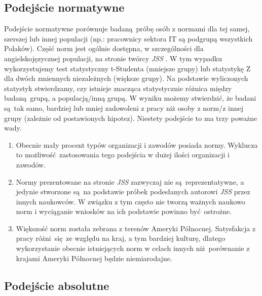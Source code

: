 \subsection{Podejście normatywne}
\label{sec:jss-calc-norm}
Podejście normatywne porównuje badaną próbę osób z normami dla tej samej, szerszej lub innej populacji (np.: pracownicy sektora IT są podgrupą wszystkich Polaków). Część norm jest ogólnie dostępna, w szczególności dla angielskojęzycznej populacji, na stronie twórcy \emph{JSS} \cite{web:jss-norms}. W tym wypadku wykorzystujemy test statystyczny t-Studenta (mniejsze grupy) lub statystykę Z dla dwóch zmiennych niezależnych (większe grupy). Na podstawie wyliczonych statystyk
stwierdzamy, czy istnieje znacząca statystycznie różnica między badaną grupą, a populacją/inną grupą. W wyniku możemy stwierdzić, że badani są tak samo, bardziej lub mniej zadowoleni z pracy niż osoby z norm/z innej grupy (zależnie od postawionych hipotez). Niestety podejście to
ma trzy poważne wady.
\begin{enumerate}
\item Obecnie mały procent typów organizacji i zawodów posiada normy. Wyklucza to możliwość zastosowania tego podejścia w dużej ilości organizacji i zawodów.
\item Normy prezentowane na stronie \emph{JSS} zazwyczaj nie są reprezentatywne, a jedynie stworzone są na podstawie próbek podesłanych autorowi \emph{JSS} przez innych naukowców. W związku z tym często nie tworzą ważnych naukowo norm i wyciąganie wniosków na ich podstawie powinno być ostrożne.
\item Większość norm została zebrana z terenów Ameryki Północnej. Satysfakcja z pracy różni się ze względu na kraj, a tym bardziej kulturę, dlatego wykorzystanie obecnie istniejących norm w celach innych niż porównanie z krajami Ameryki Północnej będzie niemiarodajne.
\end{enumerate}
 
\subsection{Podejście absolutne}
\label{sec:tests-sat-abs}

